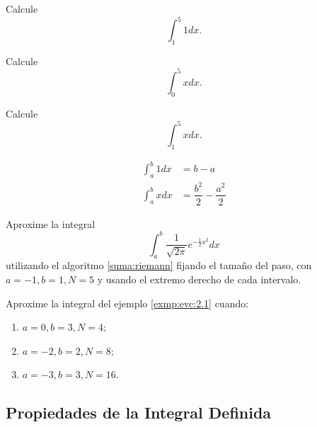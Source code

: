 	\begin{problema}
		Calcule
		$$\int_{1}^{5}1dx.$$
	\end{problema}
	



	\begin{problema}
		\label{ayr:exmp:23.3a}
		Calcule
		$$\int_{0}^{5}xdx.$$
	\end{problema}
	



	\begin{problema}
		\label{ayr:exmp:23.3b}
		Calcule
		$$\int_{1}^{5}xdx.$$
	\end{problema}
	



	\begin{proposicion}
		\begin{align}
			\label{ayr:23.2.1}
			\int_{a}^{b}1dx&=b-a\\ 
			\label{ayr:23.2.2}
			\int_{a}^{b}xdx&=\dfrac{b^{2}}{2}-\dfrac{a^{2}}{2}
		\end{align}
		
	\end{proposicion}
	



	\begin{problema}
		\label{exmp:evc:2.1}
		Aproxime la integral
		$$
		\int_{a}^{b} \dfrac{1}{\sqrt{2\pi}}e^{-\frac{1}{2}x^{2}}dx
		$$
		utilizando el algoritmo \ref{suma:riemann} fijando el tamaño del paso, con $a=-1, b=1, N=5$ y usando el extremo derecho de cada intervalo.
	\end{problema}



	\begin{problema}
		Aproxime la integral del ejemplo \ref{exmp:evc:2.1} cuando:
		\begin{enumerate}
			\item $a=0, b=3, N=4;$  
			\item $a=-2, b=2, N=8;$  
			\item $a=-3, b=3, N=16.$
		\end{enumerate}
		
	\end{problema}
	



\subsection{Propiedades de la Integral Definida}


